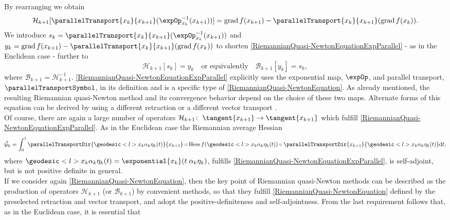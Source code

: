 By rearranging we obtain
\begin{equation}\label{RiemannianQuasi-NewtonEquationExpParallel}
    \mathcal{H}_{k+1} [\parallelTransport{x_k}{x_{k+1}}( {\expOp}^{-1}_{x_k}(x_{k+1}) )] = \operatorname{grad} f(x_{k+1}) - \parallelTransport{x_k}{x_{k+1}}(\operatorname{grad} f(x_k)). 
\end{equation}
We introduce $s_k = \parallelTransport{x_k}{x_{k+1}}( {\expOp}^{-1}_{x_k}(x_{k+1}) )$ and $y_k = \operatorname{grad} f(x_{k+1}) - \parallelTransport{x_k}{x_{k+1}}(\operatorname{grad} f(x_k))$ to shorten \cref{RiemannianQuasi-NewtonEquationExpParallel} - as in the Euclidean case - further to
\begin{equation*}
    \mathcal{H}_{k+1} [s_k] = y_k \quad \text{or equivalently} \quad \mathcal{B}_{k+1} [y_k] = s_k, 
\end{equation*}
where $\mathcal{B}_{k+1} = \mathcal{H}^{-1}_{k+1}$. \cref{RiemannianQuasi-NewtonEquationExpParallel} explicitly uses the exponential map, $\expOp$, and parallel transport, $\parallelTransportSymbol$, in its definition and is a specific type of \cref{RiemannianQuasi-NewtonEquation}. As already mentioned, the resulting Riemannian quasi-Newton method and its convergence behavior depend on the choice of these two maps. Alternate forms of this equation can be derived by using a different retraction or a different vector transport \cite[p.~19]{Huang:2013}. \\
Of course, there are again a large number of operators $\mathcal{H}_{k+1} \colon \; \tangent{x_{k+1}} \to \tangent{x_{k+1}}$ which fulfill \cref{RiemannianQuasi-NewtonEquationExpParallel}. As in the Euclidean case the Riemannian average Hessian 
\begin{equation}\label{RiemannianAverageHessian}
    \tilde{\mathcal{G}}_k = \int^{1}_{0} \parallelTransportDir{\geodesic<l>{x_k}{\alpha_k \eta_k}(t)}{x_{k+1}} \circ \operatorname{Hess} f(\geodesic<l>{x_k}{\alpha_k \eta_k}(t)) \circ \parallelTransportDir{x_{k+1}}{\geodesic<l>{x_k}{\alpha_k \eta_k}(t)} \mathrm{d}t,
\end{equation}
where $\geodesic<l>{x_k}{\alpha_k \eta_k}(t) = \exponential{x_k}(t \; \alpha_k \eta_k)$, fulfills \cref{RiemannianQuasi-NewtonEquationExpParallel}, is self-adjoint, but is not positive definite in general. \\
If we consider again \cref{RiemannianQuasi-NewtonEquation}, then the key point of Riemannian quasi-Newton methods can be described as the production of operators $\mathcal{H}_{k+1}$ (or $\mathcal{B}_{k+1}$) by convenient methods, so that they fulfill \cref{RiemannianQuasi-NewtonEquation} defined by the preselected retraction and vector transport, and adopt the positive-definiteness and self-adjointness. From the last requirement follows that, as in the Euclidean case, it is essential that 
